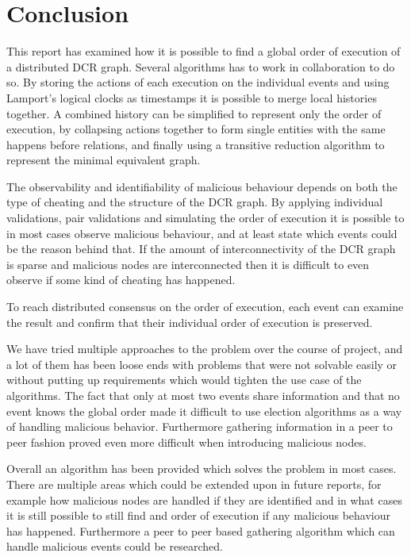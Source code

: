 \chapter{Conclusion}
This report has examined how it is possible to find a global order of execution of a distributed DCR graph. Several algorithms has to work in collaboration to do so. By storing the actions of each execution on the individual events and using Lamport's logical clocks as timestamps it is possible to merge local histories together. A combined history can be simplified to represent only the order of execution, by collapsing actions together to form single entities with the same happens before relations, and finally using a transitive reduction algorithm to represent the minimal equivalent graph.

The observability and identifiability of malicious behaviour depends on both the type of cheating and the structure of the DCR graph. By applying individual validations, pair validations and simulating the order of execution it is possible to in most cases observe malicious behaviour, and at least state which events could be the reason behind that. If the amount of interconnectivity of the DCR graph is sparse and malicious nodes are interconnected then it is difficult to even observe if some kind of cheating has happened.

To reach distributed consensus on the order of execution, each event can examine the result and confirm that their individual order of execution is preserved.


\newpar We have tried multiple approaches to the problem over the course of project, and a lot of them has been loose ends with problems that were not solvable easily or without putting up requirements which would tighten the use case of the algorithms. The fact that only at most two events share information and that no event knows the global order made it difficult to use election algorithms as a way of handling malicious behavior. Furthermore gathering information in a peer to peer fashion proved even more difficult when introducing malicious nodes.

\newpar Overall an algorithm has been provided which solves the problem in most cases. There are multiple areas which could be extended upon in future reports, for example how malicious nodes are handled if they are identified and in what cases it is still possible to still find and order of execution if any malicious behaviour has happened. Furthermore a peer to peer based gathering algorithm which can handle malicious events could be researched.


